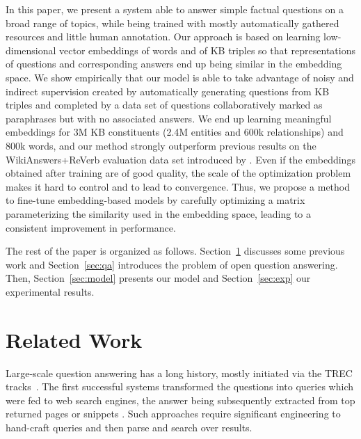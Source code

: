 \documentclass[runningheads,a4paper]{llncs}
\newcommand{\ab}[1]{{\color{black}{#1}}}
\newcommand{\wkrv}{{\sc WikiAnswers+ReVerb}\xspace}
\begin{document}
In this paper, we present a system able to answer simple factual questions on a broad range of topics, while being trained with mostly automatically gathered resources and little human annotation.
Our approach is based on learning low-dimensional vector embeddings of words and of KB triples so that representations of questions and corresponding answers end up being similar in the embedding space.
We show empirically that our model is able to take advantage of noisy and indirect supervision created by automatically generating questions from KB triples and completed by a data set of questions collaboratively marked as paraphrases but with no associated answers.
We end up learning meaningful embeddings for 3M KB constituents (2.4M entities and 600k relationships) and 800k words,  and our method strongly outperform previous results on the \wkrv evaluation data set introduced by \cite{paralex}.
\ab{More on fine-tuning since this is the first word of the title? or remove from title?}
Even if the embeddings obtained after training are of good quality, the scale of the optimization problem makes it hard to control and to lead to convergence. 
Thus, we propose a method to fine-tune embedding-based models by carefully optimizing a matrix parameterizing the similarity used in the embedding space, leading to  a consistent improvement in performance.
\fi

The rest of the  paper is organized as follows. Section~\ref{sec:rwork} discusses some previous work and Section~\ref{sec:qa} introduces the problem of open question answering. Then, Section~\ref{sec:model} presents our model and Section~\ref{sec:exp} our experimental results.


\section{Related Work}
\label{sec:rwork}

Large-scale question answering has a long history, mostly initiated via the TREC tracks~\cite{voorhees2000building}.
The first successful systems transformed the questions into queries which were fed to web search engines, the answer being subsequently extracted from top returned pages or snippets \cite{kwok2001scaling,banko2002askmsr}.
Such approaches require significant engineering to hand-craft queries and then parse and search over results.
\end{document}
